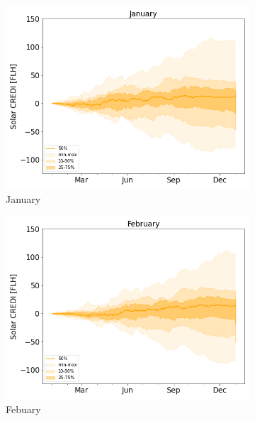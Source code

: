 \documentclass[a4paper,11pt]{extarticle}
\begin{document}
\begin{figure}[t]
\centering
\begin{subfigure}[t]{0.32\linewidth}
    \includegraphics[width=\linewidth]{Fig_CUMSUM_YearStart_SPV_January}
    \caption{January }
\end{subfigure}
\begin{subfigure}[t]{0.32\linewidth}
    \includegraphics[width=\linewidth]{Fig_CUMSUM_YearStart_SPV_February}
    \caption{Febuary }
\end{subfigure}
\begin{subfigure}[t]{0.32\linewidth}

\end{subfigure}
\end{figure}
\end{document}
